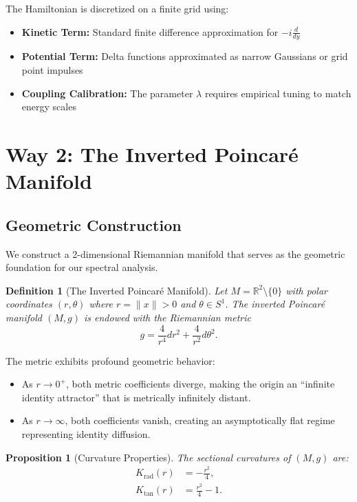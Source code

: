 \documentclass[12pt]{article}
\newtheorem{proposition}[theorem]{Proposition}
\newtheorem{definition}[theorem]{Definition}
\begin{document}
The Hamiltonian is discretized on a finite grid using:
\begin{itemize}
\item \textbf{Kinetic Term:} Standard finite difference approximation for $-i\frac{d}{dy}$
\item \textbf{Potential Term:} Delta functions approximated as narrow Gaussians or grid point impulses
\item \textbf{Coupling Calibration:} The parameter $\lambda$ requires empirical tuning to match energy scales
\end{itemize}

\section{Way 2: The Inverted Poincar\'e Manifold}

\subsection{Geometric Construction}

We construct a 2-dimensional Riemannian manifold that serves as the geometric foundation for our spectral analysis.

\begin{definition}[The Inverted Poincar\'e Manifold]
Let $M = \mathbb{R}^2 \setminus \{0\}$ with polar coordinates $(r, \theta)$ where $r = \|x\| > 0$ and $\theta \in S^1$. The \textit{inverted Poincar\'e manifold} $(M, g)$ is endowed with the Riemannian metric
\begin{equation}
g = \frac{4}{r^4} dr^2 + \frac{4}{r^2} d\theta^2.
\end{equation}
\end{definition}

The metric exhibits profound geometric behavior:
\begin{itemize}
\item As $r \to 0^+$, both metric coefficients diverge, making the origin an ``infinite identity attractor'' that is metrically infinitely distant.
\item As $r \to \infty$, both coefficients vanish, creating an asymptotically flat regime representing identity diffusion.
\end{itemize}

\begin{proposition}[Curvature Properties]
The sectional curvatures of $(M, g)$ are:
\begin{align}
K_{\text{rad}}(r) &= -\frac{r^2}{4}, \\
K_{\text{tan}}(r) &= \frac{r^2}{4} - 1.
\end{align}
\end{proposition}
\end{document}
